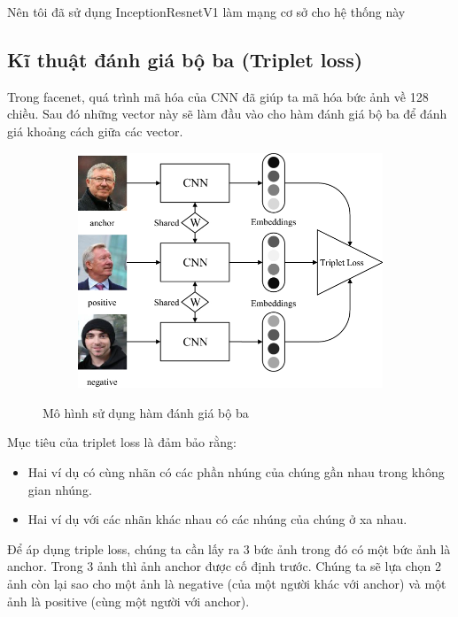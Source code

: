 Nên tôi đã sử dụng InceptionResnetV1 làm mạng cơ sở cho hệ thống này

\newpage
\subsection{Kĩ thuật đánh giá bộ ba (Triplet loss)}
Trong facenet, quá trình mã hóa của CNN đã giúp ta mã hóa bức ảnh về 128 chiều.
Sau đó những vector này sẽ làm đầu vào cho hàm đánh giá bộ ba để đánh giá khoảng
cách giữa các vector.

\begin{figure}
    \begin{subfigure}{1.\textwidth}
        \begin{center}
            \includegraphics[width=1.\linewidth]{Chapters/items/chap2_18.jpg}
        \end{center}
        \label{fig: chap2_18}
    \end{subfigure}
    \caption{Mô hình sử dụng hàm đánh giá bộ ba}
\end{figure}

Mục tiêu của triplet loss là đảm bảo rằng: 
\begin{itemize}
    \item Hai ví dụ có cùng nhãn có các phần nhúng của chúng gần nhau trong không gian nhúng.
    \item Hai ví dụ với các nhãn khác nhau có các nhúng của chúng ở xa nhau.
\end{itemize}

Để áp dụng triple loss, chúng ta cần lấy ra 3 bức ảnh trong đó có một bức ảnh là anchor.
Trong 3 ảnh thì ảnh anchor được cố định trước.
Chúng ta sẽ lựa chọn 2 ảnh còn lại sao cho một ảnh là negative
(của một người khác với anchor) và một ảnh là positive (cùng một người với anchor).


